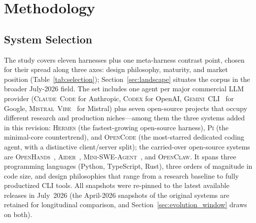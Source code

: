 \documentclass[11pt,a4paper]{article}
\newcommand{\clcode}{\textsc{Claude~Code}\xspace}
\newcommand{\cdx}{\textsc{Codex}\xspace}
\newcommand{\oh}{\textsc{OpenHands}\xspace}
\newcommand{\adr}{\textsc{Aider}\xspace}
\newcommand{\mswe}{\textsc{Mini-SWE-Agent}\xspace}
\newcommand{\ocl}{\textsc{OpenClaw}\xspace}
\newcommand{\vibe}{\textsc{Mistral~Vibe}\xspace}
\newcommand{\gemini}{\textsc{Gemini~CLI}\xspace}
\newcommand{\hrm}{\textsc{Hermes}\xspace}
\newcommand{\pib}{\textsc{Pi}\xspace}
\newcommand{\ocd}{\textsc{OpenCode}\xspace}
\begin{document}
\section{Methodology}
\label{sec:method}

\subsection{System Selection}

The study covers eleven harnesses plus one meta-harness contrast point, chosen for their spread along three axes: design philosophy, maturity, and market position (Table~\ref{tab:selection}); Section~\ref{sec:landscape} situates the corpus in the broader July-2026 field.
The set includes one agent per major commercial LLM provider (\clcode{} for Anthropic, \cdx{} for OpenAI, \gemini{}~\cite{geminicli2026} for Google, \vibe{}~\cite{mistralvibe2026} for Mistral) plus seven open-source projects that occupy different research and production niches---among them the three systems added in this revision: \hrm{} (the fastest-growing open-source harness), \pib{} (the minimal-core countertrend), and \ocd{} (the most-starred dedicated coding agent, with a distinctive client/server split); the carried-over open-source systems are \oh{}~\cite{openhands2024}, \adr{}~\cite{aider2024}, \mswe{}~\cite{miniswe2024}, and \ocl{}.
It spans three programming languages (Python, TypeScript, Rust), three orders of magnitude in code size, and design philosophies that range from a research baseline to fully productized CLI tools.
All snapshots were re-pinned to the latest available releases in July~2026 (the April-2026 snapshots of the original systems are retained for longitudinal comparison, and Section~\ref{sec:evolution_window} draws on both).
\end{document}
